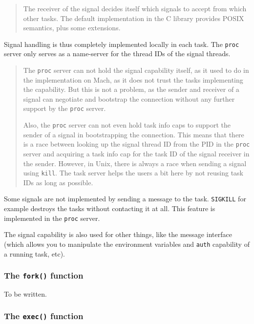 \documentclass[9pt,a4paper]{extarticle}
\newenvironment{comment}{\footnotesize \begin{quote}}{\end{quote}}
\begin{document}
\begin{comment}
  The receiver of the signal decides itself which signals to accept
  from which other tasks.  The default implementation in the C library
  provides POSIX semantics, plus some extensions.
\end{comment}

Signal handling is thus completely implemented locally in each task.
The \texttt{proc} server only serves as a name-server for the thread
IDs of the signal threads.

\begin{comment}
  The \texttt{proc} server can not hold the signal capability itself,
  as it used to do in the implementation on Mach, as it does not trust
  the tasks implementing the capability.  But this is not a problem,
  as the sender and receiver of a signal can negotiate and bootstrap
  the connection without any further support by the \texttt{proc}
  server.
  
  Also, the \texttt{proc} server can not even hold task info caps to
  support the sender of a signal in bootstrapping the connection.
  This means that there is a race between looking up the signal thread
  ID from the PID in the \texttt{proc} server and acquiring a task
  info cap for the task ID of the signal receiver in the sender.
  However, in Unix, there is always a race when sending a signal using
  \verb/kill/.  The task server helps the users a bit here by not
  reusing task IDs as long as possible.
\end{comment}

Some signals are not implemented by sending a message to the task.
\verb/SIGKILL/ for example destroys the tasks without contacting it at
all.  This feature is implemented in the \texttt{proc} server.

The signal capability is also used for other things, like the message
interface (which allows you to manipulate the environment variables
and \texttt{auth} capability of a running task, etc).


\subsubsection{The \texttt{fork()} function}

To be written.


\subsubsection{The \texttt{exec()} function}
\label{exec}
\end{document}
